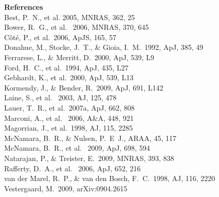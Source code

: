 \documentclass[12pt]{article}
\begin{document}
\newpage
\noindent
{\bf References}\\
\noindent 
Best, P.~N., et al.  2005, MNRAS, 362, 25\\
Bower, R.~G., et al. \ 2006, MNRAS, 370, 645 \\
C{\^o}t{\'e}, P., et al.\ 2006, ApJS, 165, 57 \\
Donahue, M., Stocke, J.~T., \& Gioia, I.~M.\ 1992, ApJ, 385, 49 \\
Ferrarese, L., \& Merritt, D.\ 2000, ApJ, 539, L9 \\
Ford, H.~C., et al.\ 1994, ApJ, 435, L27 \\
Gebhardt, K., et al.\ 2000, ApJ, 539, L13 \\
Kormendy, J., \& Bender, R.\ 2009, ApJ, 691, L142 \\
Laine, S., et al. \ 2003, AJ, 125, 478\\
Lauer, T.~R., et al.\ 2007a, ApJ, 662, 808 \\
Marconi, A., et al. \ 2006, A\&A, 448, 921 \\
Magorrian, J., et al.\ 1998, AJ, 115, 2285\\ 
McNamara, B.~R., \& Nulsen, P.~E~J., ARAA, 45, 117 \\
McNamara, B.~R., et al. \ 2009, ApJ, 698, 594 \\
Natarajan, P., \& Treister, E.\ 2009, MNRAS, 393, 838 \\
Rafferty, D.~A., et al. \ 2006, ApJ, 652, 216 \\
van der Marel, R.~P., \& van den Bosch, F.~C.\ 1998, AJ, 116, 2220 \\
Vestergaard, M.\ 2009, arXiv:0904.2615\\
\end{document}

